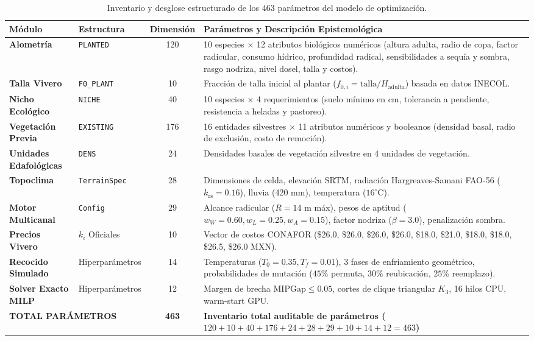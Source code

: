 \documentclass[11pt,a4paper]{article}
\begin{document}
\begin{table}[H]
\centering
\small
\caption{Inventario y desglose estructurado de los 463 parámetros del modelo de optimización.}\label{tab:desglose_parametros}
\begin{tabularx}{\textwidth}{llcX}
\toprule
\textbf{Módulo} & \textbf{Estructura} & \textbf{Dimensión} & \textbf{Parámetros y Descripción Epistemológica} \\
\midrule
\textbf{Alometría} & \texttt{PLANTED} & 120 & 10 especies $\times$ 12 atributos biológicos numéricos (altura adulta, radio de copa, factor radicular, consumo hídrico, profundidad radical, sensibilidades a sequía y sombra, rasgo nodriza, nivel dosel, talla y costos). \\
\textbf{Talla Vivero} & \texttt{F0\_PLANT} & 10 & Fracción de talla inicial al plantar ($f_{0,i} = \text{talla} / H_{\text{adulta}}$) basada en datos INECOL. \\
\textbf{Nicho Ecológico} & \texttt{NICHE} & 40 & 10 especies $\times$ 4 requerimientos (suelo mínimo en cm, tolerancia a pendiente, resistencia a heladas y pastoreo). \\
\textbf{Vegetación Previa} & \texttt{EXISTING} & 176 & 16 entidades silvestres $\times$ 11 atributos numéricos y booleanos (densidad basal, radio de exclusión, costo de remoción). \\
\textbf{Unidades Edafológicas} & \texttt{DENS} & 24 & Densidades basales de vegetación silvestre en 4 unidades de vegetación. \\
\textbf{Topoclima} & \texttt{TerrainSpec} & 28 & Dimensiones de celda, elevación SRTM, radiación Hargreaves-Samani FAO-56 ($k_{\text{rs}}=0.16$), lluvia (420 mm), temperatura ($16^\circ\text{C}$). \\
\textbf{Motor Multicanal} & \texttt{Config} & 29 & Alcance radicular ($R=14\text{ m}$ máx), pesos de aptitud ($w_W=0.60, w_L=0.25, w_A=0.15$), factor nodriza ($\beta=3.0$), penalización sombra. \\
\textbf{Precios Vivero} & $k_i$ Oficiales & 10 & Vector de costos CONAFOR (\$26.0, \$26.0, \$26.0, \$26.0, \$18.0, \$21.0, \$18.0, \$18.0, \$26.5, \$26.0 MXN). \\
\textbf{Recocido Simulado} & Hiperparámetros & 14 & Temperaturas ($T_0=0.35, T_f=0.01$), 3 fases de enfriamiento geométrico, probabilidades de mutación ($45\%$ permuta, $30\%$ reubicación, $25\%$ reemplazo). \\
\textbf{Solver Exacto MILP} & Hiperparámetros & 12 & Margen de brecha $\text{MIPGap} \le 0.05$, cortes de clique triangular $K_3$, 16 hilos CPU, warm-start GPU. \\
\midrule
\multicolumn{2}{l}{\textbf{TOTAL PARÁMETROS}} & \textbf{463} & \textbf{Inventario total auditable de parámetros ($120+10+40+176+24+28+29+10+14+12 = 463$)} \\
\bottomrule
\end{tabularx}
\end{table}
\end{document}
